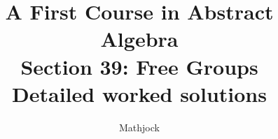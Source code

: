 
\title{\textbf{A First Course in Abstract Algebra}\\[0.3em]Section 39: Free Groups\\[0.3em]\large Detailed worked solutions}
\author{Mathjock}
\date{}

\maketitle
\bookinfo
\tableofcontents
\clearpage
\renewcommand{\thesection}{39}
\renewcommand{\theHsection}{fraleigh.39}



